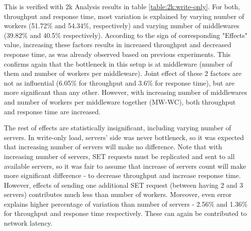 \documentclass[11pt,a4paper]{article}
\begin{document}
This is verified with 2k Analysis results in table \ref{table:2k:write-only}. For both, throughput and response time, most variation is explained by varying number of workers (51.72\% and 54.34\%, respectively) and varying number of middlewares (39.82\% and 40.5\% respectively). According to the sign of corresponding "Effects" value, increasing these factors results in increased throughput and decreased response time, as was already observed based on previous experiments. This confirms again that the bottleneck in this setup is at middleware (number of them and number of workers per middleware). Joint effect of these 2 factors are not as influential (6.05\% for throughput and 3.6\% for response time), but are more significant than any other. However, with increasing number of middlewares and number of workers per middleware together (MW-WC), both throughput and response time are increased.

The rest of effects are statistically insignificant, including varying number of servers. In write-only load, servers' side was never bottleneck, so it was expected that increasing number of servers will make no difference. Note that with increasing number of servers, SET requests must be replicated and sent to all available servers, so it was fair to assume that increase of servers count will make more significant difference - to decrease throughput and increase response time. However, effects of sending one additional SET request (between having 2 and 3 servers) contributes much less than number of workers. Moreover, even error explains higher percentage of variation than number of servers - 2.56\% and 1.36\% for throughput and response time respectively. These can again be contributed to network latency.
	
\end{document}
